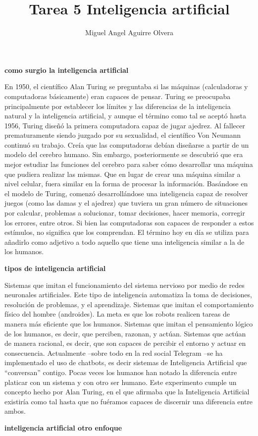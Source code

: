 \documentclass[11pt,a4paper]{article}
\author{Miguel Angel Aguirre Olvera}
\title{Tarea 5 Inteligencia artificial}
\date{}
\begin{document}
\maketitle 
\begin{multicols}{2}
\begin{center}
\textbf{como surgio la inteligencia artificial}
\end{center}
En 1950, el científico Alan Turing se preguntaba si las máquinas (calculadoras y computadoras básicamente) eran capaces de pensar.
Turing se preocupaba principalmente por establecer los límites y las diferencias de la inteligencia natural y la inteligencia artificial, y aunque el término como tal se aceptó hasta 1956, Turing diseñó la primera computadora capaz de jugar ajedrez.
Al fallecer prematuramente siendo juzgado por su sexualidad, el científico Von Neumann continuó su trabajo. Creía que las computadoras debían diseñarse a partir de un modelo del cerebro humano.
Sin embargo, posteriormente se descubrió que era mejor estudiar las funciones del cerebro para saber cómo desarrollar una máquina que pudiera realizar las mismas. Que en lugar de crear una máquina similar a nivel celular, fuera similar en la forma de procesar la información.
Basándose en el modelo de Turing, comenzó desarrollándose una inteligencia capaz de resolver juegos (como las damas y el ajedrez) que tuviera un gran número de situaciones por calcular, problemas a solucionar, tomar decisiones, hacer memoria, corregir los errores, entre otros.
Si bien las computadoras son capaces de responder a estos estímulos, no significa que los comprendan.
El término hoy en día se utiliza para añadirlo como adjetivo a todo aquello que tiene una inteligencia similar a la de los humanos.
\begin{center}
\textbf{tipos de inteligencia artificial}
\end{center}
Sistemas que imitan el funcionamiento del sistema nervioso por medio de redes neuronales artificiales. Este tipo de inteligencia automatiza la toma de decisiones, resolución de problemas, y el aprendizaje.
Sistemas que imitan el comportamiento físico del hombre (androides). La meta es que los robots realicen tareas de manera más eficiente que los humanos.
Sistemas que imitan el pensamiento lógico de los humanos, es decir, que perciben, razonan, y actúan.
Sistemas que actúan de manera racional, es decir, que son capaces de percibir el entorno y actuar en consecuencia.
Actualmente –sobre todo en la red social Telegram –se ha implementado el uso de chatbots, es decir sistemas de Inteligencia Artificial que “conversan” contigo. Pocas veces los humanos han notado la diferencia entre platicar con un sistema y con otro ser humano. Este experimento cumple un concepto hecho por Alan Turing, en el que afirmaba que la Inteligencia Artificial existiría como tal hasta que no fuéramos capaces de discernir una diferencia entre ambos.
\begin{center}
\textbf{inteligencia artificial otro enfoque}
\end{center}


\end{multicols}
\end{document}
